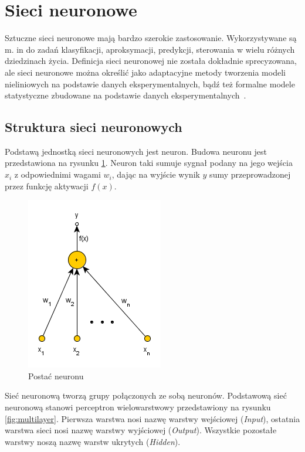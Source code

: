 \newpage
\section{Sieci neuronowe} 

Sztuczne sieci neuronowe mają bardzo szerokie zastosowanie. Wykorzystywane są m. in do zadań klasyfikacji, aproksymacji, predykcji, sterowania w wielu różnych dziedzinach życia. Definicja sieci neuronowej nie została dokładnie sprecyzowana, ale sieci neuronowe można określić jako adaptacyjne metody tworzenia modeli nieliniowych na podstawie danych eksperymentalnych, bądź też formalne modele statystyczne zbudowane na podstawie danych eksperymentalnych~\cite{Jankowski}.
 
\subsection{Struktura sieci neuronowych}
Podstawą jednostką sieci neuronowych jest neuron. Budowa neuronu jest przedstawiona na rysunku \ref{fig:neuron}. Neuron taki sumuje sygnał podany na jego wejścia $x_i$ z odpowiednimi wagami $w_i$, dając na wyjście wynik $y$ sumy przeprowadzonej przez funkcję aktywacji $f(x)$.
\begin{figure}[ht!]
	\centering
	\includegraphics[scale=0.8]{images/single_neuron.png}
	\caption{Postać neuronu}
	\label{fig:neuron}
\end{figure}

Sieć neuronową tworzą grupy połączonych ze sobą neuronów. Podstawową sieć neuronową stanowi perceptron wielowarstwowy przedstawiony na rysunku  \ref{fig:multilayer}. Pierwsza warstwa nosi nazwę warstwy wejściowej (\textit{Input}), ostatnia warstwa sieci nosi nazwę warstwy wyjściowej (\textit{Output}). Wszystkie pozostałe warstwy noszą nazwę warstw ukrytych (\textit{Hidden}).

